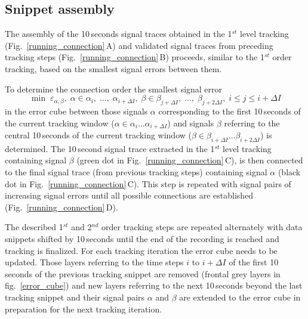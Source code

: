 \documentclass[11pt,pdftex]{article}
\newcommand{\panel}[1]{\textsf{#1}}
\newcommand{\fref}[1]{\textup{\ref{#1}}}
\newcommand{\subfref}[2]{\textup{\ref{#1}}\,\panel{#2}}
\newcommand{\fig}{Fig.}
\newcommand{\subfigref}[2]{\fig~\subfref{#1}{#2}}
\newcommand{\figb}{fig.}
\newcommand{\figrefb}[1]{\figb~\fref{#1}}
\begin{document}
\begin{figure}[t]
\begin{minipage}[t]{0.43\textwidth}
  \end{minipage}
\end{figure}

\subsection{Snippet assembly}
The assembly of the 10\,seconds signal traces obtained in the 1$^{st}$ level tracking (\subfigref{running_connection}{A}) and validated signal traces from preceding tracking steps (\subfigref{running_connection}{B}) proceeds, similar to the 1$^{st}$ order tracking, based on the smallest signal errors between them. 

To determine the connection order the smallest signal error 
\begin{equation}\label{min_e_snippet_connect}
  \min \; \varepsilon_{\alpha, \beta}, \; \alpha \in \alpha_i,\;\dots,\;\alpha_{i + \Delta I}, \; \beta \in \beta_{j + \Delta I},\;\dots,\;\beta_{j + 2\Delta I}, \; i \leq j \leq i + \Delta I 
\end{equation}
in the error cube between those signals $\alpha$ corresponding to the first 10\,seconds of the current tracking window ($\alpha \in \alpha_i \dots \alpha_{i + \Delta I}$) and signals $\beta$ referring to the central 10\,seconds of the current tracking window ($\beta \in \beta_{i + \Delta I} \dots \beta_{i + 2\Delta I}$) is determined. The 10\,second signal trace extracted in the 1$^{st}$ level tracking containing signal $\beta$ (green dot in \subfigref{running_connection}{C}), is then connected to the final  signal trace (from previous tracking steps) containing signal $\alpha$ (black dot in \subfigref{running_connection}{C}). This step is repeated with signal pairs of increasing signal errors until all possible connections are established (\subfigref{running_connection}{D}). 

The described 1$^{st}$ and 2$^{nd}$ order tracking steps are repeated alternately with data snippets shifted by 10\,seconds until the end of the recording is reached and tracking is finalized. For each tracking iteration the error cube needs to be updated. Those layers referring to the time steps $i$ to $i + \Delta I$ of the first 10\,seconds of the previous tracking snippet are removed (frontal grey layers in \figrefb{error_cube}) and new layers referring to the next 10\,seconds beyond the last tracking snippet and their signal pairs $\alpha$ and $\beta$ are extended to the error cube in preparation for the next tracking iteration.
\end{document}
